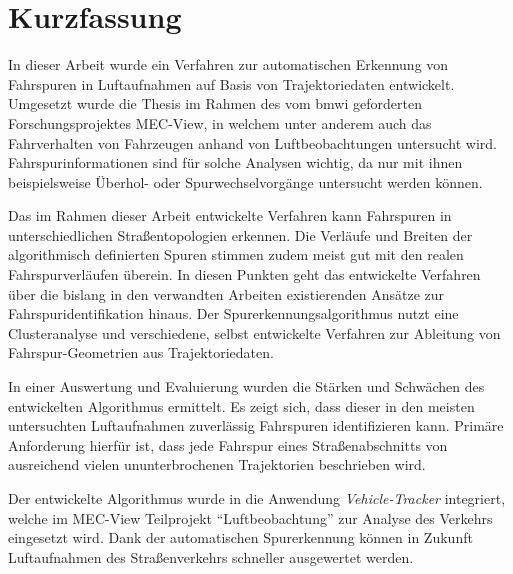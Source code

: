 
\chapter{Kurzfassung}

In dieser Arbeit wurde ein Verfahren zur automatischen Erkennung von Fahrspuren in Luftaufnahmen
auf Basis von Trajektoriedaten entwickelt. Umgesetzt wurde die Thesis im Rahmen des vom \acrshort*{bmwi}
geforderten Forschungsprojektes MEC-View, in welchem unter anderem auch das Fahrverhalten von Fahrzeugen
anhand von Luftbeobachtungen untersucht wird. Fahrspurinformationen sind für solche Analysen
wichtig, da nur mit ihnen beispielsweise Überhol- oder Spurwechselvorgänge untersucht werden können.

Das im Rahmen dieser Arbeit entwickelte Verfahren kann Fahrspuren in unterschiedlichen Straßentopologien
erkennen. Die Verläufe und Breiten der algorithmisch definierten Spuren stimmen zudem meist gut mit den realen
Fahrspurverläufen überein. In diesen Punkten geht das entwickelte Verfahren über die bislang in den
verwandten Arbeiten existierenden Ansätze zur Fahrspuridentifikation hinaus.
Der Spurerkennungsalgorithmus nutzt eine Clusteranalyse und verschiedene, selbst entwickelte Verfahren zur
Ableitung von Fahrspur-Geometrien aus Trajektoriedaten.

In einer Auswertung und Evaluierung wurden die Stärken und Schwächen des entwickelten Algorithmus ermittelt.
Es zeigt sich, dass dieser in den meisten untersuchten Luftaufnahmen zuverlässig Fahrspuren identifizieren kann.
Primäre Anforderung hierfür ist, dass jede Fahrspur eines Straßenabschnitts von ausreichend vielen ununterbrochenen
Trajektorien beschrieben wird.

Der entwickelte Algorithmus wurde in die Anwendung \textit{Vehicle-Tracker} integriert,
welche im MEC-View Teilprojekt ``Luftbeobachtung'' zur Analyse des Verkehrs eingesetzt wird.
Dank der automatischen Spurerkennung können in Zukunft Luftaufnahmen des Straßenverkehrs schneller
ausgewertet werden.


